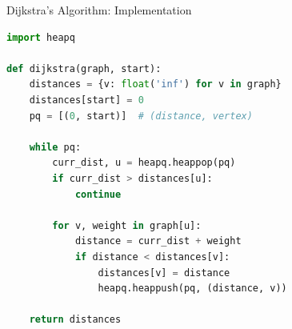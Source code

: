 \documentclass[aspectratio=169,xcolor=dvipsnames]{beamer}
\begin{document}
\begin{frame}[fragile]{Dijkstra's Algorithm: Implementation}
\begin{lstlisting}[language=Python]
import heapq

def dijkstra(graph, start):
    distances = {v: float('inf') for v in graph}
    distances[start] = 0
    pq = [(0, start)]  # (distance, vertex)

    while pq:
        curr_dist, u = heapq.heappop(pq)
        if curr_dist > distances[u]:
            continue

        for v, weight in graph[u]:
            distance = curr_dist + weight
            if distance < distances[v]:
                distances[v] = distance
                heapq.heappush(pq, (distance, v))

    return distances
\end{lstlisting}
\end{frame}
\end{document}
